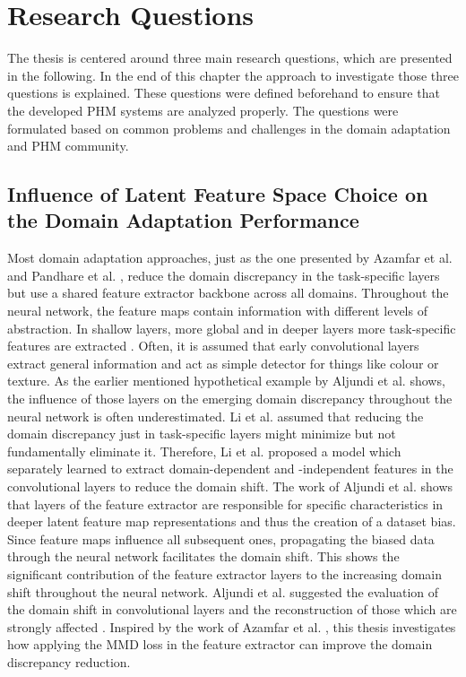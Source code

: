 \chapter{Research Questions}\label{chapter:research_approach}
The thesis is centered around three main research questions, which are presented in the following. In the end of this chapter the approach to investigate those three questions is explained. These questions were defined beforehand to ensure that the developed PHM systems are analyzed properly. The questions were formulated based on common problems and challenges in the domain adaptation and PHM community. 

\section{Influence of Latent Feature Space Choice on the Domain Adaptation Performance}
Most domain adaptation approaches, just as the one presented by Azamfar et al. \cite{AZAMFAR2020103932} and Pandhare et al. \cite{Pandhare2021}, reduce the domain discrepancy in the task-specific layers but use a shared feature extractor backbone across all domains. Throughout the neural network, the feature maps contain information with different levels of abstraction. In shallow layers, more global and in deeper layers more task-specific features are extracted \cite{Aljundi2016}. Often, it is assumed that early convolutional layers extract general information and act as simple detector for things like colour or texture. As the earlier mentioned hypothetical example by Aljundi et al. \cite{Aljundi2016} shows, the influence of those layers on the emerging domain discrepancy throughout the neural network is often underestimated. Li et al. \cite{li2020} assumed that reducing the domain discrepancy just in task-specific layers might minimize but not fundamentally eliminate it. Therefore, Li et al. \cite{li2020} proposed a model which separately learned to extract domain-dependent and -independent features in the convolutional layers to reduce the domain shift. The work of Aljundi et al. \cite{Aljundi2016} shows that layers of the feature extractor are responsible for specific characteristics in deeper latent feature map representations and thus the creation of a dataset bias. Since feature maps influence all subsequent ones, propagating the biased data through the neural network facilitates the domain shift. This shows the significant contribution of the feature extractor layers to the increasing domain shift throughout the neural network. Aljundi et al. suggested the evaluation of the domain shift in convolutional layers and the reconstruction of those which are strongly affected \cite{Aljundi2016}. Inspired by the work of Azamfar et al. \cite{Aljundi2016}, this thesis investigates how applying the MMD loss in the feature extractor can improve the domain discrepancy reduction.


